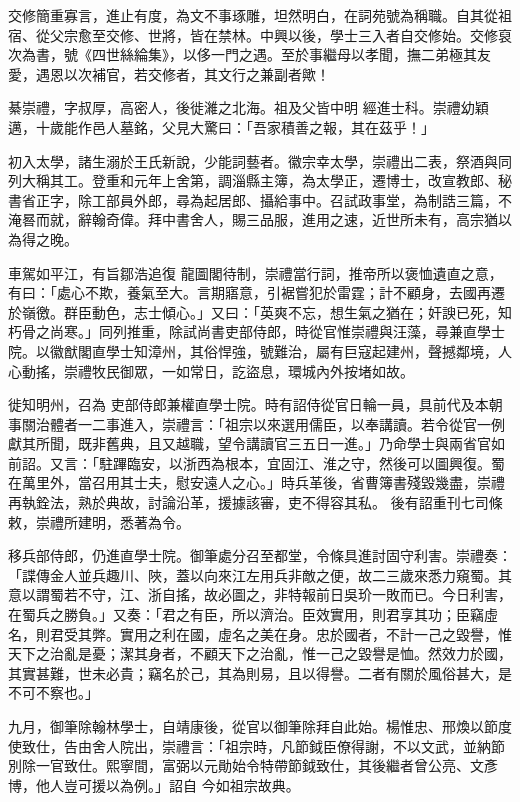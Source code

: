 \begin{pinyinscope}
 交修簡重寡言，進止有度，為文不事琢雕，坦然明白，在詞苑號為稱職。自其從祖宿、從父宗愈至交修、世將，皆在禁林。中興以後，學士三入者自交修始。交修裒次為書，號《四世絲綸集》，以侈一門之遇。至於事繼母以孝聞，撫二弟極其友愛，遇恩以次補官，若交修者，其文行之兼副者歟！



 綦崇禮，字叔厚，高密人，後徙濰之北海。祖及父皆中明
 經進士科。崇禮幼穎邁，十歲能作邑人墓銘，父見大驚曰：「吾家積善之報，其在茲乎！」



 初入太學，諸生溺於王氏新說，少能詞藝者。徽宗幸太學，崇禮出二表，祭酒與同列大稱其工。登重和元年上舍第，調淄縣主簿，為太學正，遷博士，改宣教郎、秘書省正字，除工部員外郎，尋為起居郎、攝給事中。召試政事堂，為制誥三篇，不淹晷而就，辭翰奇偉。拜中書舍人，賜三品服，進用之速，近世所未有，高宗猶以為得之晚。



 車駕如平江，有旨鄒浩追復
 龍圖閣待制，崇禮當行詞，推帝所以褒恤遺直之意，有曰：「處心不欺，養氣至大。言期寤意，引裾嘗犯於雷霆；計不顧身，去國再遷於嶺徼。群臣動色，志士傾心。」又曰：「英爽不忘，想生氣之猶在；奸諛已死，知朽骨之尚寒。」同列推重，除試尚書吏部侍郎，時從官惟崇禮與汪藻，尋兼直學士院。以徽猷閣直學士知漳州，其俗悍強，號難治，屬有巨寇起建州，聲撼鄰境，人心動搖，崇禮牧民御眾，一如常日，訖盜息，環城內外按堵如故。



 徙知明州，召為
 吏部侍郎兼權直學士院。時有詔侍從官日輪一員，具前代及本朝事關治體者一二事進入，崇禮言：「祖宗以來選用儒臣，以奉講讀。若令從官一例獻其所聞，既非舊典，且又越職，望令講讀官三五日一進。」乃命學士與兩省官如前詔。又言：「駐蹕臨安，以浙西為根本，宜固江、淮之守，然後可以圖興復。蜀在萬里外，當召用其士夫，慰安遠人之心。」時兵革後，省曹簿書殘毀幾盡，崇禮再執銓法，熟於典故，討論沿革，援據該審，吏不得容其私。
 後有詔重刊七司條敕，崇禮所建明，悉著為令。



 移兵部侍郎，仍進直學士院。御筆處分召至都堂，令條具進討固守利害。崇禮奏：「諜傳金人並兵趣川、陜，蓋以向來江左用兵非敵之便，故二三歲來悉力窺蜀。其意以謂蜀若不守，江、浙自搖，故必圖之，非特報前日吳玠一敗而已。今日利害，在蜀兵之勝負。」又奏：「君之有臣，所以濟治。臣效實用，則君享其功；臣竊虛名，則君受其弊。實用之利在國，虛名之美在身。忠於國者，不計一己之毀譽，惟
 天下之治亂是憂；潔其身者，不顧天下之治亂，惟一己之毀譽是恤。然效力於國，其實甚難，世未必貴；竊名於己，其為則易，且以得譽。二者有關於風俗甚大，是不可不察也。」



 九月，御筆除翰林學士，自靖康後，從官以御筆除拜自此始。楊惟忠、邢煥以節度使致仕，告由舍人院出，崇禮言：「祖宗時，凡節鉞臣僚得謝，不以文武，並納節別除一官致仕。熙寧間，富弼以元勛始令特帶節鉞致仕，其後繼者曾公亮、文彥博，他人豈可援以為例。」詔自
 今如祖宗故典。




\end{pinyinscope}
